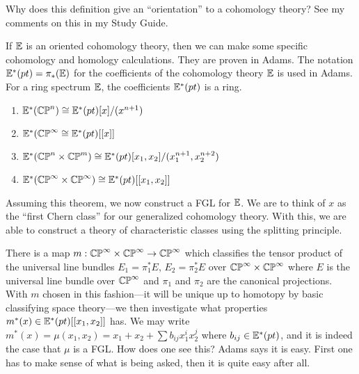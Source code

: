 \documentclass{article}%
\begin{document}
Why does this definition give an ``orientation'' to a cohomology
theory? See my comments on this in my Study Guide. 

\begin{theorem}
If $\mathbb{E}$ is an oriented cohomology theory, then we can make some
specific cohomology and homology calculations. They are proven in
Adams. The notation $\mathbb{E}^*(pt)=\pi_*(\mathbb{E})$ for the coefficients of
the cohomology theory $\mathbb{E}$ is used in Adams. For a ring spectrum
$\mathbb{E}$, the coefficients $\mathbb{E}^*(pt)$ is a ring.
\begin{enumerate}
\item $\mathbb{E}^*(\mathbb{CP}^n) \cong \mathbb{E}^*(pt)[x]/(x^{n+1})$
\item $\mathbb{E}^*(\mathbb{CP}^{\infty} \cong \mathbb{E}^*(pt)[[x]]$ 
\item $\mathbb{E}^*( \mathbb{CP}^n \times \mathbb{CP}^m) \cong \mathbb{E}^*(pt) [x_1,x_2] /
(x_1^{n+1},x_2^{n+2})$
\item $\mathbb{E}^*(\mathbb{CP}^{\infty}\times\mathbb{CP}^{\infty}) \cong
\mathbb{E}^*(pt)[[x_1,x_2]]$
\end{enumerate}
\end{theorem}

Assuming this theorem, we now construct a FGL for $\mathbb{E}$. We are to
think of $x$ as the ``first Chern class'' for our generalized
cohomology theory. With this, we are able to construct a theory of
characteristic classes using the splitting principle. 

There is a map $m: \mathbb{CP}^{\infty} \times \mathbb{CP}^{\infty}
\rightarrow \mathbb{CP}^{\infty}$ which classifies the tensor product of
the universal line bundles $E_1=\pi_1^*E$, $E_2=\pi_2^*E$ over
$\mathbb{CP}^{\infty}\times \mathbb{CP}^{\infty}$ where $E$ is the universal
line bundle over $\mathbb{CP}^{\infty}$ and $\pi_1$ and $\pi_2$ are the
canonical projections. With $m$ chosen in this fashion---it will be
unique up to homotopy by basic classifying space theory---we then
investigate what properties $m^*(x)\in\mathbb{E}^*(pt)[[x_1,x_2]]$ has. We
may write $m^*(x) =\mu(x_1,x_2) = x_1 + x_2 + \sum b_{ij}x_1^i x_2^j$
where $b_{ij}\in \mathbb{E}^*(pt)$, and it is indeed the case that $\mu$ is
a FGL. How does one see this? Adams says it is easy. First one has to
make sense of what is being asked, then it is quite easy after all.
\end{document}
